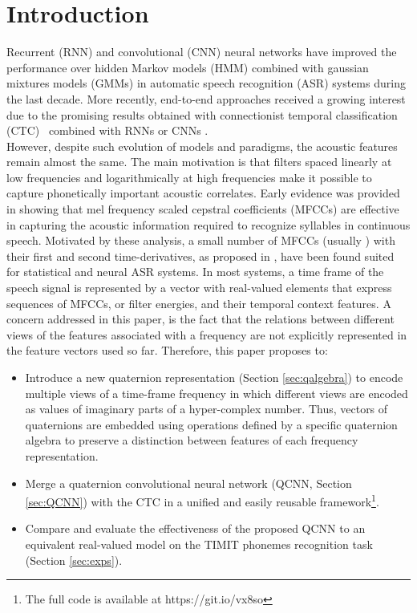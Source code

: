 \documentclass[a4paper]{article}
\begin{document}
\section{Introduction}  
Recurrent (RNN) and convolutional (CNN) neural networks have improved the performance over hidden Markov models (HMM) combined with gaussian mixtures models (GMMs) in automatic speech recognition (ASR) systems \cite{sak2014long, hinton2012deep,abdel2012applying,mirco2017timit,greff2017lstm} during the last decade.
More recently, end-to-end approaches received a growing interest due to the promising results obtained with connectionist temporal classification (CTC)~\cite{graves2006connectionist} combined with RNNs \cite{sak2014long} or CNNs \cite{zhang2017towards}.\\
However, despite such evolution of models and paradigms, the acoustic features remain almost the same. The main motivation is that filters spaced linearly at low frequencies and logarithmically at high frequencies make it possible to capture phonetically important acoustic correlates. Early evidence was provided in \cite{davis1990comparison} showing that mel frequency scaled cepstral coefficients (MFCCs) are effective in capturing the acoustic information required to recognize syllables in continuous speech.
Motivated by these analysis, a small number of MFCCs (usually ) with their first and second time-derivatives, as proposed in \cite{furui1986speaker}, have been found suited for statistical and neural ASR systems. In most systems, a time frame of the speech signal is represented by a vector with real-valued elements that express sequences of MFCCs, or filter energies, and their temporal context features. A concern addressed in this paper, is the fact that the relations between different views of the features associated with a frequency are not explicitly represented in the feature vectors used so far. 
Therefore, this paper proposes to:
\begin{itemize}
\item Introduce a new quaternion representation (Section \ref{sec:qalgebra}) to encode multiple views of a time-frame frequency in which different views are encoded as values of imaginary parts of a hyper-complex number. Thus, vectors of quaternions are embedded using operations defined by a specific quaternion algebra to preserve a distinction between features of each frequency representation.
\item Merge a quaternion convolutional neural network (QCNN, Section \ref{sec:QCNN}) with the CTC in a unified and easily reusable framework\footnote{The full code is available at https://git.io/vx8so}.
\item Compare and evaluate the effectiveness of the proposed QCNN to an equivalent real-valued model on the TIMIT \cite{garofolo1993darpa} phonemes recognition task (Section \ref{sec:exps}). 
\end{itemize}
\end{document}
